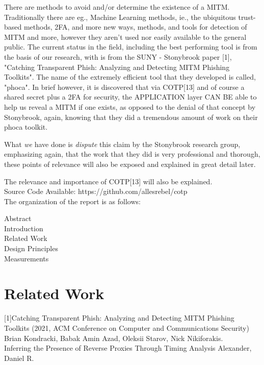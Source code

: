 \documentclass[a4paper, 11pt]{article} 				%
\begin{document}
There are methods to avoid and/or determine the existence of a MITM. Traditionally there are eg., Machine Learning methods, ie., the ubiquitous trust-based methods, 2FA, and more new ways, methods, and tools for detection of MITM and more, however they aren't used nor easily available to the general public.
The current status in the field, including the best performing tool is from the basis of our research, with is from the SUNY - Stonybrook paper [1], "Catching Transparent Phish: Analyzing and Detecting MITM  Phishing Toolkits". The name of the extremely efficient tool that they developed is called, "phoca". In brief however, it is discovered that via COTP[13] and of course a shared secret plus a 2FA for security, the APPLICATION layer CAN BE able to help us reveal a MITM if one exists, as opposed to the denial of that concept by Stonybrook, again, knowing that they did a tremendous amount of work on their phoca toolkit. 

What \textit{we} have done is \textit{dispute} this claim by the Stonybrook research group, emphasizing again, that the work that they did is very professional and thorough, these points of relevance will also be exposed and explained in great detail later. 

\noindent
The relevance and importance of COTP[13] will also be explained.\\

\noindent
Source Code Available: https://github.com/allesrebel/cotp\\
The organization of the report is as follows:

\noindent
Abstract\\
Introduction\\
Related Work\\
Design Principles\\
Measurements\\



\section{Related Work}
[1]Catching Transparent Phish: Analyzing and Detecting MITM Phishing Toolkits (2021, ACM Conference on Computer and Communications Security)
Brian Kondracki, Babak Amin Azad, Oleksii Starov, Nick Nikiforakis.\\

\noindent
[18]Inferring the Presence of Reverse Proxies Through Timing Analysis
Alexander, Daniel R.\\
\end{document}
